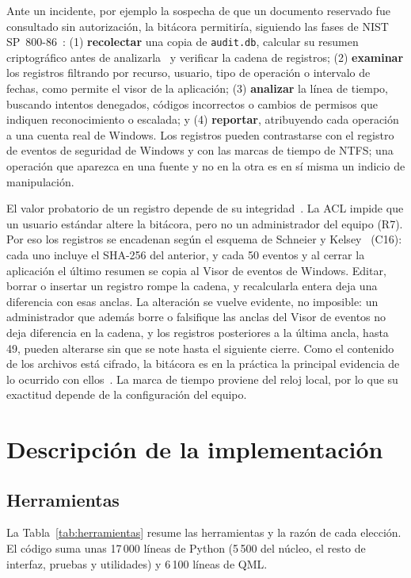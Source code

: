 \documentclass[conference]{IEEEtran}
\begin{document}
Ante un incidente, por ejemplo la sospecha de que un documento reservado fue consultado sin autorización, la bitácora permitiría, siguiendo las fases de NIST SP~800-86~\cite{sp80086}: (1) \textbf{recolectar} una copia de \texttt{audit.db}, calcular su resumen criptográfico antes de analizarla~\cite{iso27037} y verificar la cadena de registros; (2) \textbf{examinar} los registros filtrando por recurso, usuario, tipo de operación o intervalo de fechas, como permite el visor de la aplicación; (3) \textbf{analizar} la línea de tiempo, buscando intentos denegados, códigos incorrectos o cambios de permisos que indiquen reconocimiento o escalada; y (4) \textbf{reportar}, atribuyendo cada operación a una cuenta real de Windows. Los registros pueden contrastarse con el registro de eventos de seguridad de Windows y con las marcas de tiempo de NTFS; una operación que aparezca en una fuente y no en la otra es en sí misma un indicio de manipulación.

El valor probatorio de un registro depende de su integridad~\cite{sp80092}. La ACL impide que un usuario estándar altere la bitácora, pero no un administrador del equipo (R7). Por eso los registros se encadenan según el esquema de Schneier y Kelsey~\cite{schneier} (C16): cada uno incluye el SHA-256 del anterior, y cada 50 eventos y al cerrar la aplicación el último resumen se copia al Visor de eventos de Windows. Editar, borrar o insertar un registro rompe la cadena, y recalcularla entera deja una diferencia con esas anclas. La alteración se vuelve evidente, no imposible: un administrador que además borre o falsifique las anclas del Visor de eventos no deja diferencia en la cadena, y los registros posteriores a la última ancla, hasta 49, pueden alterarse sin que se note hasta el siguiente cierre. Como el contenido de los archivos está cifrado, la bitácora es en la práctica la principal evidencia de lo ocurrido con ellos~\cite{garfinkel}. La marca de tiempo proviene del reloj local, por lo que su exactitud depende de la configuración del equipo.

\section{Descripción de la implementación}
\label{sec:implementacion}

\subsection{Herramientas}
La Tabla~\ref{tab:herramientas} resume las herramientas y la razón de cada elección. El código suma unas 17\,000 líneas de Python (5\,500 del núcleo, el resto de interfaz, pruebas y utilidades) y 6\,100 líneas de QML.
\end{document}

